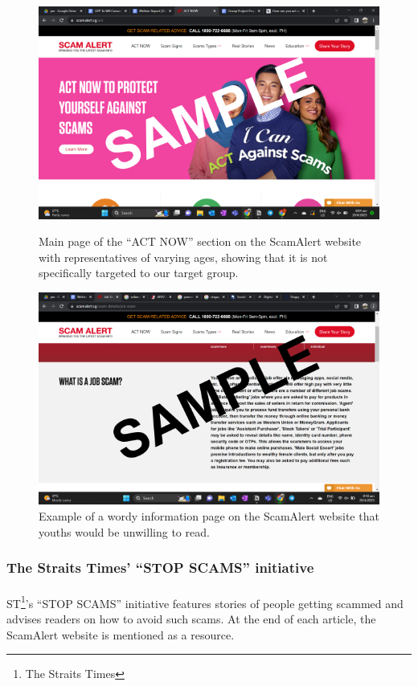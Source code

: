\message{ !name(written-report.tex)}\documentclass[a4paper]{article}
\begin{document}
\begin{figure}[ht]
  \centering \includegraphics[width=\textwidth]{scamalert}
  \caption{Main page of the ``ACT NOW'' section on the ScamAlert website with
    representatives of varying ages, showing that it is not specifically
    targeted to our target group.}\label{fig:scamalert}
  \endminipage\hfill
  \centering \includegraphics[width=\textwidth]{scamalertwordy}
  \caption{Example of a wordy information page on the ScamAlert website that
    youths would be unwilling to read.}\label{fig:scamalertwordy}
  \endminipage{}
\end{figure}

\subsubsection{The Straits Times' ``STOP SCAMS'' initiative}
\paragraph{} ST\footnote{The Straits Times}'s ``STOP SCAMS'' initiative features
stories of people getting scammed and advises readers on how to avoid such
scams. At the end of each article, the ScamAlert website is mentioned as a
resource.
\end{document}
